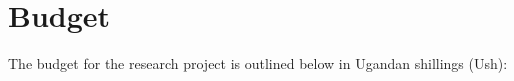 \section{Budget}

The budget for the research project is outlined below in Ugandan shillings (Ush):


